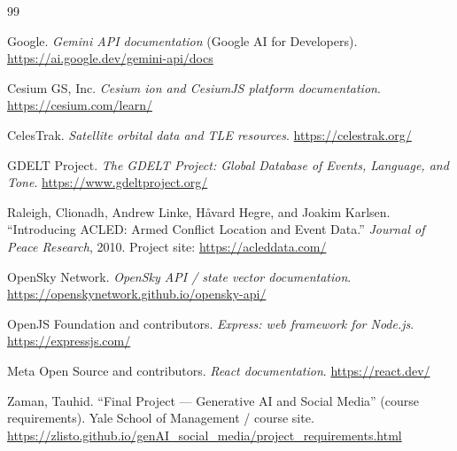 {}

\begin{thebibliography}{99}

Google.
\newblock \emph{Gemini API documentation} (Google AI for Developers).
\newblock \url{https://ai.google.dev/gemini-api/docs}

Cesium GS, Inc.
\newblock \emph{Cesium ion and CesiumJS platform documentation}.
\newblock \url{https://cesium.com/learn/}

CelesTrak.
\newblock \emph{Satellite orbital data and TLE resources}.
\newblock \url{https://celestrak.org/}

GDELT Project.
\newblock \emph{The GDELT Project: Global Database of Events, Language, and Tone}.
\newblock \url{https://www.gdeltproject.org/}

Raleigh, Clionadh, Andrew Linke, H\aa{}vard Hegre, and Joakim Karlsen.
\newblock ``Introducing ACLED: Armed Conflict Location and Event Data.''
\newblock \emph{Journal of Peace Research}, 2010.
\newblock Project site: \url{https://acleddata.com/}

OpenSky Network.
\newblock \emph{OpenSky API / state vector documentation}.
\newblock \url{https://openskynetwork.github.io/opensky-api/}

OpenJS Foundation and contributors.
\newblock \emph{Express: web framework for Node.js}.
\newblock \url{https://expressjs.com/}

Meta Open Source and contributors.
\newblock \emph{React documentation}.
\newblock \url{https://react.dev/}

Zaman, Tauhid.
\newblock ``Final Project --- Generative AI and Social Media'' (course requirements).
\newblock Yale School of Management / course site.
\newblock \url{https://zlisto.github.io/genAI_social_media/project_requirements.html}

\end{thebibliography}
